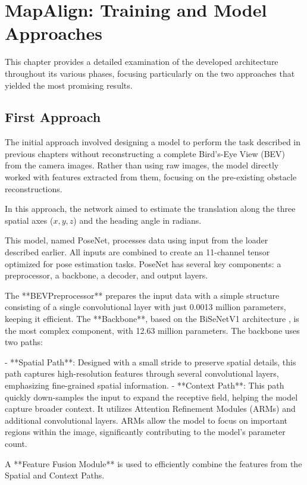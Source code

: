 \NoBgThispage
\chapter{MapAlign: Training and Model Approaches}

This chapter provides a detailed examination of the developed architecture throughout its various phases, focusing particularly on the two approaches that yielded the most promising results.

\section{First Approach}

The initial approach involved designing a model to perform the task described in previous chapters without reconstructing a complete Bird's-Eye View (BEV) from the camera images. Rather than using raw images, the model directly worked with features extracted from them, focusing on the pre-existing obstacle reconstructions.

In this approach, the network aimed to estimate the translation along the three spatial axes (\( x, y, z \)) and the heading angle in radians.

This model, named PoseNet, processes data using input from the loader described earlier. All inputs are combined to create an 11-channel tensor optimized for pose estimation tasks. PoseNet has several key components: a preprocessor, a backbone, a decoder, and output layers. 

The **BEVPreprocessor** prepares the input data with a simple structure consisting of a single convolutional layer with just 0.0013 million parameters, keeping it efficient. The **Backbone**, based on the BiSeNetV1 architecture \cite{DBLP:journals/corr/abs-1808-00897}, is the most complex component, with 12.63 million parameters. The backbone uses two paths: 

- **Spatial Path**: Designed with a small stride to preserve spatial details, this path captures high-resolution features through several convolutional layers, emphasizing fine-grained spatial information.
- **Context Path**: This path quickly down-samples the input to expand the receptive field, helping the model capture broader context. It utilizes Attention Refinement Modules (ARMs) and additional convolutional layers. ARMs allow the model to focus on important regions within the image, significantly contributing to the model's parameter count.

A **Feature Fusion Module** is used to efficiently combine the features from the Spatial and Context Paths.

